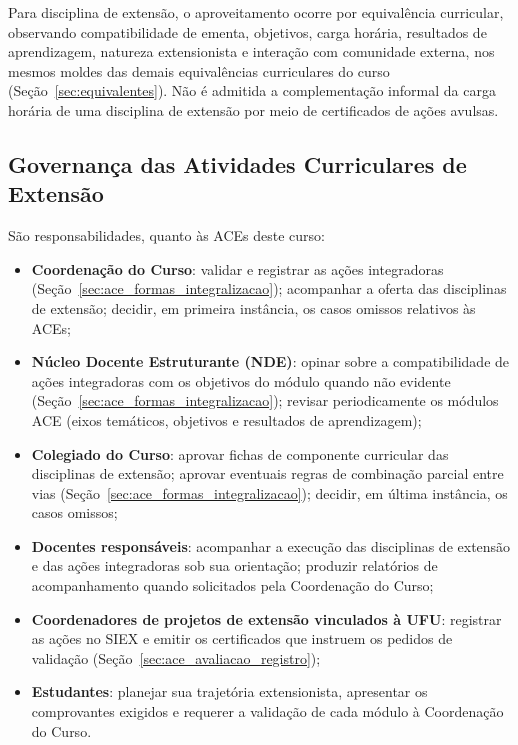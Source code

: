 Para disciplina de extensão, o aproveitamento ocorre por equivalência curricular, observando compatibilidade de ementa, objetivos, carga horária, resultados de aprendizagem, natureza extensionista e interação com comunidade externa, nos mesmos moldes das demais equivalências curriculares do curso (Seção~\ref{sec:equivalentes}\unskip). Não é admitida a complementação informal da carga horária de uma disciplina de extensão por meio de certificados de ações avulsas.

\subsection{Governança das Atividades Curriculares de Extensão}
\label{sec:ace_governanca}

São responsabilidades, quanto às ACEs deste curso:

\begin{itemize}
    \item \textbf{Coordenação do Curso}: validar e registrar as ações integradoras (Seção~\ref{sec:ace_formas_integralizacao}\unskip); acompanhar a oferta das disciplinas de extensão; decidir, em primeira instância, os casos omissos relativos às ACEs;
    \item \textbf{Núcleo Docente Estruturante (NDE)}: opinar sobre a compatibilidade de ações integradoras com os objetivos do módulo quando não evidente (Seção~\ref{sec:ace_formas_integralizacao}\unskip); revisar periodicamente os módulos ACE (eixos temáticos, objetivos e resultados de aprendizagem);
    \item \textbf{Colegiado do Curso}: aprovar fichas de componente curricular das disciplinas de extensão; aprovar eventuais regras de combinação parcial entre vias (Seção~\ref{sec:ace_formas_integralizacao}\unskip); decidir, em última instância, os casos omissos;
    \item \textbf{Docentes responsáveis}: acompanhar a execução das disciplinas de extensão e das ações integradoras sob sua orientação; produzir relatórios de acompanhamento quando solicitados pela Coordenação do Curso;
    \item \textbf{Coordenadores de projetos de extensão vinculados à UFU}: registrar as ações no SIEX e emitir os certificados que instruem os pedidos de validação (Seção~\ref{sec:ace_avaliacao_registro}\unskip);
    \item \textbf{Estudantes}: planejar sua trajetória extensionista, apresentar os comprovantes exigidos e requerer a validação de cada módulo à Coordenação do Curso.
\end{itemize}

